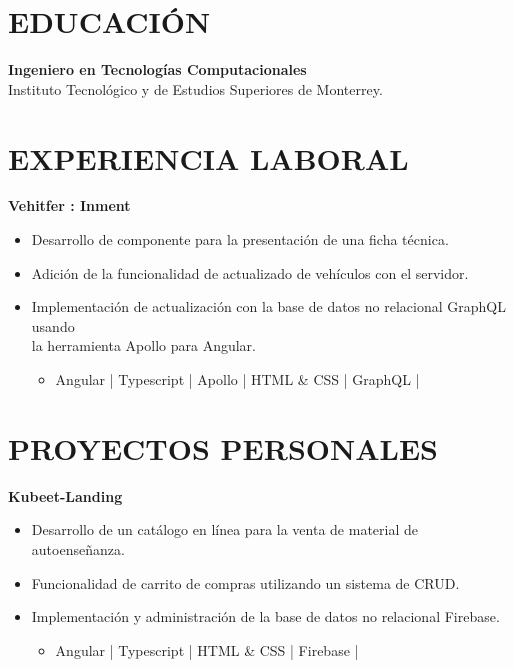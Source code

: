 \documentclass{res}
\begin{document}
\address{
}

\begin{resume}
    \vspace{-4mm}
    \separator

    \section{\large{EDUCACIÓN}} 
    \textbf{Ingeniero en Tecnologías Computacionales} 
     \\
    Instituto Tecnológico y de Estudios Superiores de Monterrey.
    
    \section{\large{EXPERIENCIA LABORAL}} 
    \textbf{Vehitfer : Inment} 
    \begin{itemize}
        \item Desarrollo de componente para la presentación de una ficha técnica.
        \item Adición de la funcionalidad de actualizado de vehículos con el servidor.
        \item Implementación de actualización con la base de datos no relacional GraphQL usando \\ la herramienta Apollo para Angular.
        \begin{itemize}
            \item Angular | Typescript | Apollo | HTML \& CSS | GraphQL |
        \end{itemize}
    \end{itemize}

    \section{\large{PROYECTOS PERSONALES}} 
    \textbf{Kubeet-Landing} 
    \begin{itemize}
        \item Desarrollo de un catálogo en línea para la venta de material de autoenseñanza.
        \item Funcionalidad de carrito de compras utilizando un sistema de CRUD.
        \item Implementación y administración de la base de datos no relacional Firebase.
        \begin{itemize}
            \item Angular | Typescript | HTML \& CSS | Firebase |
        \end{itemize}
    \end{itemize}


\end{resume}
\end{document}
